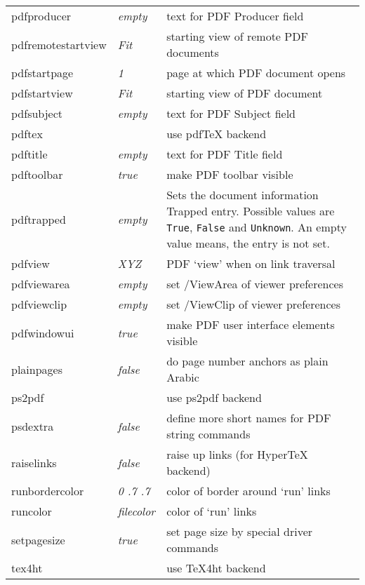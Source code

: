 \documentclass{article}
\begin{document}
\begin{longtable}{@{}>{\ttfamily}llp{7cm}@{}}
pdfproducer        & \textit{empty}         & text for PDF Producer field \\
pdfremotestartview & \textit{Fit}           & starting view of remote PDF documents \\
pdfstartpage       & \textit{1}             & page at which PDF document opens \\
pdfstartview       & \textit{Fit}           & starting view of PDF document \\
pdfsubject         & \textit{empty}         & text for PDF Subject field \\
pdftex             &                        & use \textsf{pdf\TeX} backend \\
pdftitle           & \textit{empty}         & text for PDF Title field \\
pdftoolbar         & \textit{true}          & make PDF toolbar visible \\
pdftrapped         & \textit{empty} & Sets the document information Trapped entry.
  Possible values are \texttt{True}, \texttt{False} and \texttt{Unknown}.
  An empty value means, the entry is not set.\\
pdfview            & \textit{XYZ}           & PDF `view' when on link traversal \\
pdfviewarea        & \textit{empty}         & set /ViewArea of viewer preferences \\
pdfviewclip        & \textit{empty}         & set /ViewClip of viewer preferences \\
pdfwindowui        & \textit{true}          & make PDF user interface elements visible \\
plainpages         & \textit{false}         & do page number anchors as plain Arabic \\
ps2pdf             &                        & use \textsf{ps2pdf} backend \\
psdextra           & \textit{false}         & define more short names for PDF string commands \\
raiselinks         & \textit{false}         & raise up links (for \textsf{Hyper\TeX} backend) \\
runbordercolor     & \textit{0 .7 .7}       & color of border around `run' links \\
runcolor           & \textit{filecolor}     & color of `run' links\\
setpagesize        & \textit{true}          & set page size by special driver commands \\
tex4ht             &                        & use \textsf{\TeX4ht} backend \\

\end{longtable}
\end{document}
